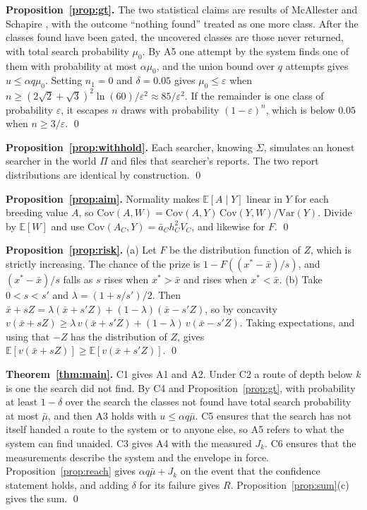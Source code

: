 \documentclass[10pt,twocolumn]{article}
\theoremstyle{plain}
\theoremstyle{definition}
\newcommand{\Ex}{\mathbb{E}}
\newcommand{\para}[1]{\smallskip\noindent\textbf{#1}\enspace}
\begin{document}
\para{Proposition~\ref{prop:gt}.} The two statistical claims are results of McAllester and
Schapire \cite{mcallester2000}, with the outcome ``nothing found'' treated as one more class.
After the classes found have been gated, the uncovered classes are those never returned, with
total search probability $\mu_{0}$. By A5 one attempt by the system finds one of them with
probability at most $\alpha\mu_{0}$, and the union bound over $q$ attempts gives
$u\le\alpha q\mu_{0}$. Setting $n_{1}=0$ and $\delta=0.05$ gives $\mu_{0}\le\varepsilon$ when
$n\ge(2\sqrt{2}+\sqrt{3})^{2}\ln(60)/\varepsilon^{2}\approx 85/\varepsilon^{2}$. If the
remainder is one class of probability $\varepsilon$, it escapes $n$ draws with probability
$(1-\varepsilon)^{n}$, which is below $0.05$ when $n\ge 3/\varepsilon$. \qed

\para{Proposition~\ref{prop:withhold}.} Each searcher, knowing $\Sigma$, simulates an honest
searcher in the world $\Pi$ and files that searcher's reports. The two report distributions
are identical by construction. \qed

\para{Proposition~\ref{prop:aim}.} Normality makes $\Ex[A\mid Y]$ linear in $Y$ for each
breeding value $A$, so
$\mathrm{Cov}(A,W)=\mathrm{Cov}(A,Y)\,\mathrm{Cov}(Y,W)/\mathrm{Var}(Y)$. Divide by $\Ex[W]$
and use $\mathrm{Cov}(A_C,Y)=\bar a_Ch_C^2V_C$, and likewise for $F$. \qed

\para{Proposition~\ref{prop:risk}.} (a) Let $F$ be the distribution function of $Z$, which is
strictly increasing. The chance of the prize is $1-F((x^{*}-\bar x)/s)$, and
$(x^{*}-\bar x)/s$ falls as $s$ rises when $x^{*}>\bar x$ and rises when $x^{*}<\bar x$.
(b) Take $0<s<s'$ and $\lambda=(1+s/s')/2$. Then
$\bar x+sZ=\lambda(\bar x+s'Z)+(1-\lambda)(\bar x-s'Z)$, so by concavity
$v(\bar x+sZ)\ge\lambda\,v(\bar x+s'Z)+(1-\lambda)\,v(\bar x-s'Z)$. Taking expectations, and
using that $-Z$ has the distribution of $Z$, gives
$\Ex[v(\bar x+sZ)]\ge\Ex[v(\bar x+s'Z)]$. \qed

\para{Theorem~\ref{thm:main}.} C1 gives A1 and A2. Under C2 a route of depth below $k$ is one
the search did not find. By C4 and Proposition~\ref{prop:gt}, with probability at least
$1-\delta$ over the search the classes not found have total search probability at most
$\bar\mu$, and then A3 holds with $u\le\alpha q\bar\mu$. C5 ensures that the search has not
itself handed a route to the system or to anyone else, so A5 refers to what the system can
find unaided. C3 gives A4 with the measured $J_{k}$. C6 ensures that the
measurements describe the system and the envelope in force. Proposition~\ref{prop:reach} gives $\alpha q\bar\mu+J_{k}$ on the event that the confidence statement holds, and adding
$\delta$ for its failure gives $R$. Proposition~\ref{prop:sum}(c) gives the sum. \qed
\end{document}
